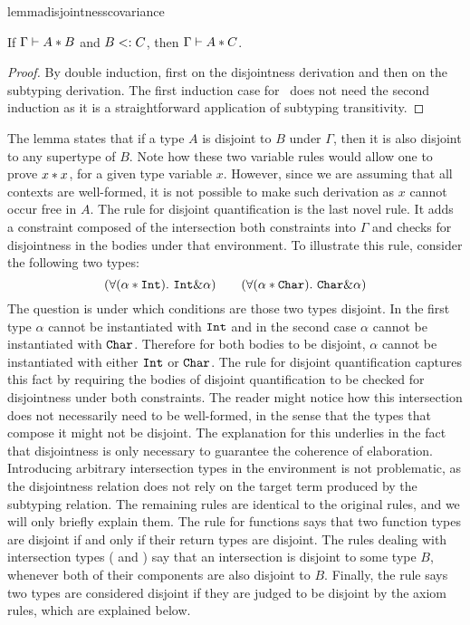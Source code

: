 \begin{restatable}{lemma}{disjointnesscovariance}
  \label{lemma:disjointness-covariance}

  If $\Gamma \vdash A * B$ and $B <: C$, then $\Gamma \vdash A * C$.
\end{restatable}
\begin{proof}
By double induction, first on the disjointness derivation and then on the subtyping derivation.
The first induction case for~ does not need the second induction as it is 
a straightforward application of subtyping transitivity. 
\end{proof}

The lemma states that if a type $A$ is disjoint to $B$ under $\Gamma$, then it is also disjoint
to any supertype of $B$. 
Note how these two variable rules would allow one to prove $x * x$, for a given type 
variable $x$.
However, since we are assuming that all contexts are well-formed, it is not possible to make
such derivation as $x$ cannot occur free in $A$. 
The rule for disjoint quantification  is the last novel rule. 
It adds a constraint composed of the intersection both constraints into $\Gamma$ and checks for 
disjointness in the bodies under that environment.
To illustrate this rule, consider the following two types:
\[ (\forall (\alpha * \texttt{Int}).~\texttt{Int} \& \alpha) \qquad 
(\forall (\alpha * \texttt{Char}). ~\texttt{Char} \& \alpha) \]
The question is under which conditions are those two types disjoint.
In the first type $\alpha$ cannot be instantiated with $\texttt{Int}$ and in
the second case $\alpha$ cannot be instantiated with $\texttt{Char}$.
Therefore for both bodies to be disjoint, $\alpha$ cannot be instantiated with either $\texttt{Int}$ 
or $\texttt{Char}$. 
The rule for disjoint quantification captures this fact by requiring the bodies of disjoint 
quantification to be checked for disjointness under both constraints.
The reader might notice how this intersection does not necessarily need to be well-formed,
in the sense that the types that compose it might not be disjoint.
The explanation for this underlies in the fact that disjointness is only necessary to guarantee
the coherence of elaboration.
Introducing arbitrary intersection types in the environment is not problematic, as the disjointness
relation does not rely on the target term produced by the subtyping relation.
The remaining rules are identical to the original rules, and we will only briefly explain them.
The rule for functions  says that two function
types are disjoint if and only if their return types are disjoint. 
The rules dealing with intersection types (
and ) say that an intersection is disjoint to some type $B$, whenever
both of their components are also disjoint to $B$.
Finally, the rule  says two types are considered disjoint if they are
judged to be disjoint by the axiom rules, which are explained below.

